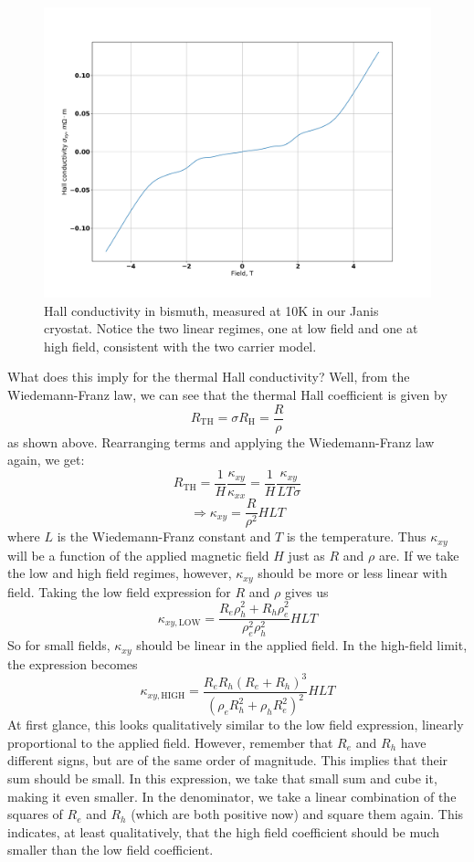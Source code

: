 \documentclass{thesis-umich}
\begin{document}
\begin{figure}
	\caption[Hall Conductivity in Bismuth]{Hall conductivity in bismuth, measured at 10K in our Janis cryostat. Notice the two linear regimes, one at low field and one at high field, consistent with the two carrier model.}
	\label{fig:bismuth_hall}
	\includegraphics[width=\columnwidth]{figures/BiHallEffect.pdf}
\end{figure}

What does this imply for the thermal Hall conductivity? Well, from the Wiedemann-Franz law, we can see that the thermal Hall coefficient is given by
\[ R_{\mathrm{TH}} = \sigma R_{\mathrm{H}} = \frac{R}{\rho}\]
as shown above. Rearranging terms and applying the Wiedemann-Franz law again, we get:
\[ R_{\mathrm{TH}} = \frac{1}{H}\frac{\kappa_{xy}}{\kappa_{xx}} = \frac{1}{H}\frac{\kappa_{xy}}{LT\sigma}\]
\[ \Rightarrow \kappa_{xy} = \frac{R}{\rho^2}HLT \]
where $L$ is the Wiedemann-Franz constant and $T$ is the temperature. Thus $\kappa_{xy}$ will be a function of the applied magnetic field $H$ just as $R$ and $\rho$ are. If we take the low and high field regimes, however, $\kappa_{xy}$ should be more or less linear with field. Taking the low field expression for $R$ and $\rho$ gives us
\[ \kappa_{xy,\mathrm{LOW}} = \frac{R_e\rho_h^2 + R_h \rho_e^2}{\rho_e^2 \rho_h^2} HLT \]
So for small fields, $\kappa_{xy}$ should be linear in the applied field. In the high-field limit, the expression becomes
\[ \kappa_{xy,\mathrm{HIGH}} = \frac{R_e R_h (R_e + R_h)^3}{(\rho_e R_h^2 + \rho_h R_e^2)^2} HLT \]
At first glance, this looks qualitatively similar to the low field expression, linearly proportional to the applied field. However, remember that $R_e$ and $R_h$ have different signs, but are of the same order of magnitude. This implies that their sum should be small. In this expression, we take that small sum and cube it, making it even smaller. In the denominator, we take a linear combination of the squares of $R_e$ and $R_h$ (which are both positive now) and square them again. This indicates, at least qualitatively, that the high field coefficient should be much smaller than the low field coefficient.
\end{document}
